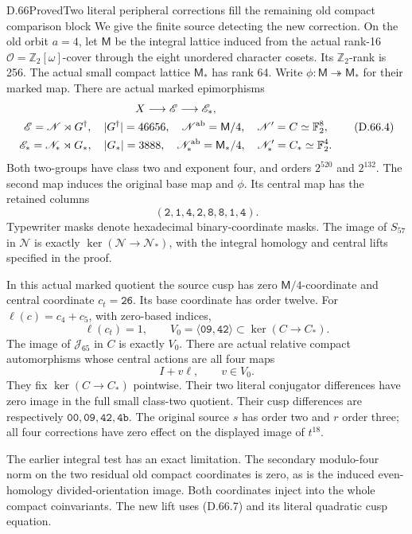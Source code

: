 \begin{statement}{D.66}{Proved}{Two literal peripheral corrections fill the remaining old compact comparison block}
We give the finite source detecting the new correction. On the old
orbit \(a=4\), let \(\mathsf M\) be the integral lattice induced
from the actual rank-16 \(\mathcal O=\mathbb Z_2[\omega]\)-cover
through the eight unordered character cosets. Its \(\mathbb Z_2\)-rank
is 256. The actual small compact lattice \(\mathsf M_*\) has rank 64.
Write \(\phi:\mathsf M\twoheadrightarrow\mathsf M_*\) for their
marked map. There are actual marked epimorphisms
\[
 \begin{gathered}
 X\longrightarrow \mathscr E
       \longrightarrow\mathscr E_*,\\
 \mathscr E=\mathscr N\rtimes G^\dagger,\quad
 |G^\dagger|=46656,\quad
 \mathscr N^{\rm ab}=\mathsf M/4,\quad
 \mathscr N'=C\simeq\mathbb F_2^8,\\
 \mathscr E_*=\mathscr N_*\rtimes G_*,\quad
 |G_*|=3888,\quad
 \mathscr N_*^{\rm ab}=\mathsf M_*/4,\quad
 \mathscr N_*'=C_*\simeq\mathbb F_2^4 .
 \end{gathered}
 \tag{D.66.4}
\]
Both two-groups have class two and exponent four, and orders
\(2^{520}\) and \(2^{132}\). The second map induces the original
base map and \(\phi\). Its central map has the retained columns
\[
 (\mathtt{2},\mathtt{1},\mathtt{4},\mathtt{2},
   \mathtt{8},\mathtt{8},\mathtt{1},\mathtt{4}).
 \tag{D.66.5}
\]
Typewriter masks denote hexadecimal binary-coordinate masks.
The image of \(S_{57}\) in \(\mathscr N\) is exactly
\(\ker(\mathscr N\to\mathscr N_*)\), with the integral
homology and central lifts specified in the proof.

In this actual marked quotient the source cusp has zero
\(\mathsf M/4\)-coordinate and central coordinate
\(c_t=\mathtt{26}\). Its base coordinate has order twelve.
For \(\ell(c)=c_4+c_5\), with zero-based indices,
\[
 \ell(c_t)=1,\qquad
 V_0=\langle\mathtt{09},\mathtt{42}\rangle
       \subset\ker(C\to C_*).
 \tag{D.66.6}
\]
The image of \(\mathcal J_{65}\) in \(C\) is exactly \(V_0\).
There are actual relative compact automorphisms whose central
actions are all four maps
\[
                    I+v\ell,\qquad v\in V_0.
 \tag{D.66.7}
\]
They fix \(\ker(C\to C_*)\) pointwise. Their two literal
conjugator differences have zero image in the full small
class-two quotient. Their cusp differences are respectively
\(\mathtt{00},\mathtt{09},\mathtt{42},\mathtt{4b}\).
The original source \(s\) has order two and \(r\) order three;
all four corrections have zero effect on the displayed image
of \(t^{18}\).

The earlier integral test has an exact limitation. The secondary
modulo-four norm on the two residual old compact coordinates is
zero, as is the induced even-homology divided-orientation image.
Both coordinates inject into the whole compact coinvariants.
The new lift uses (D.66.7) and its literal quadratic cusp equation.


\end{statement}

